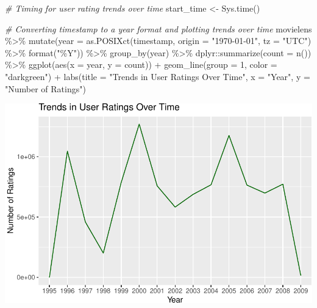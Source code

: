 \documentclass[
]{article}
\newenvironment{Shaded}{}{}
\newcommand{\AttributeTok}[1]{\textcolor[rgb]{0.49,0.56,0.16}{#1}}
\newcommand{\CommentTok}[1]{\textcolor[rgb]{0.38,0.63,0.69}{\textit{#1}}}
\newcommand{\DecValTok}[1]{\textcolor[rgb]{0.25,0.63,0.44}{#1}}
\newcommand{\FunctionTok}[1]{\textcolor[rgb]{0.02,0.16,0.49}{#1}}
\newcommand{\NormalTok}[1]{#1}
\newcommand{\OtherTok}[1]{\textcolor[rgb]{0.00,0.44,0.13}{#1}}
\newcommand{\SpecialCharTok}[1]{\textcolor[rgb]{0.25,0.44,0.63}{#1}}
\newcommand{\StringTok}[1]{\textcolor[rgb]{0.25,0.44,0.63}{#1}}
\begin{document}
\begin{Shaded}
\begin{Highlighting}[]
\CommentTok{\# Timing for user rating trends over time}
\NormalTok{start\_time }\OtherTok{\textless{}{-}} \FunctionTok{Sys.time}\NormalTok{()}

\CommentTok{\# Converting timestamp to a year format and plotting trends over time}
\NormalTok{movielens }\SpecialCharTok{\%\textgreater{}\%}
  \FunctionTok{mutate}\NormalTok{(}\AttributeTok{year =} \FunctionTok{as.POSIXct}\NormalTok{(timestamp, }
                           \AttributeTok{origin =} \StringTok{"1970{-}01{-}01"}\NormalTok{, }
                           \AttributeTok{tz =} \StringTok{"UTC"}\NormalTok{) }\SpecialCharTok{\%\textgreater{}\%} \FunctionTok{format}\NormalTok{(}\StringTok{"\%Y"}\NormalTok{)) }\SpecialCharTok{\%\textgreater{}\%}
  \FunctionTok{group\_by}\NormalTok{(year) }\SpecialCharTok{\%\textgreater{}\%}
\NormalTok{  dplyr}\SpecialCharTok{::}\FunctionTok{summarize}\NormalTok{(}\AttributeTok{count =} \FunctionTok{n}\NormalTok{()) }\SpecialCharTok{\%\textgreater{}\%}
  \FunctionTok{ggplot}\NormalTok{(}\FunctionTok{aes}\NormalTok{(}\AttributeTok{x =}\NormalTok{ year, }\AttributeTok{y =}\NormalTok{ count)) }\SpecialCharTok{+}
  \FunctionTok{geom\_line}\NormalTok{(}\AttributeTok{group =} \DecValTok{1}\NormalTok{, }\AttributeTok{color =} \StringTok{"darkgreen"}\NormalTok{) }\SpecialCharTok{+}
  \FunctionTok{labs}\NormalTok{(}\AttributeTok{title =} 
         \StringTok{"Trends in User Ratings Over Time"}\NormalTok{, }\AttributeTok{x =} \StringTok{"Year"}\NormalTok{, }\AttributeTok{y =} \StringTok{"Number of Ratings"}\NormalTok{)}
\end{Highlighting}
\end{Shaded}

\begin{center}\includegraphics{BI_MovieLens_Project_HarvardX_Ph125_9x_files/figure-latex/rating_trends-1} \end{center}
\end{document}

